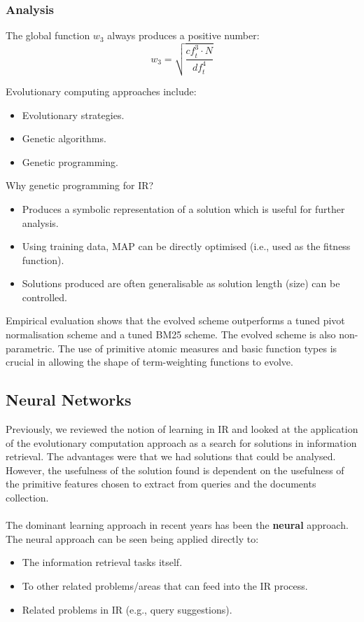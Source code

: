 \documentclass[a4paper,11pt]{article}
\begin{document}
\subsubsection{Analysis}
The global function $w_3$ always produces a positive number:
\[
    w_3 = \sqrt{\frac{\textit{cf}^3_t \cdot N}{\textit{df}^4_t}}
\]


\begin{tcolorbox}[colback=gray!10, colframe=black, title=\textbf{Case Study 1: Application of Genetic Programming to IR}]
    Evolutionary computing approaches include:
    \begin{itemize}
        \item   Evolutionary strategies.
        \item   Genetic algorithms.
        \item   Genetic programming.
    \end{itemize}

    Why genetic programming for IR?
    \begin{itemize}
        \item   Produces a symbolic representation of a solution which is useful for further analysis.
        \item   Using training data, MAP can be directly optimised (i.e., used as the fitness function).
        \item   Solutions produced are often generalisable as solution length (size) can be controlled.
    \end{itemize}
\end{tcolorbox}

Empirical evaluation shows that the evolved scheme outperforms a tuned pivot normalisation scheme and a tuned BM25 scheme.
The evolved scheme is also non-parametric.
The use of primitive atomic measures and basic function types is crucial in allowing the shape of term-weighting functions to evolve.

\subsection{Neural Networks}
Previously, we reviewed the notion of learning in IR and looked at the application of the evolutionary computation approach as a search for solutions in information retrieval.
The advantages were that we had solutions that could be analysed.
However, the usefulness of the solution found is dependent on the usefulness of the primitive features chosen to extract from queries and the documents collection.
\\\\
The dominant learning approach in recent years has been the \textbf{neural} approach.
The neural approach can be seen being applied directly to:
\begin{itemize}
    \item   The information retrieval tasks itself.
    \item   To other related problems/areas that can feed into the IR process.
    \item   Related problems in IR (e.g., query suggestions).
\end{itemize}
\end{document}

